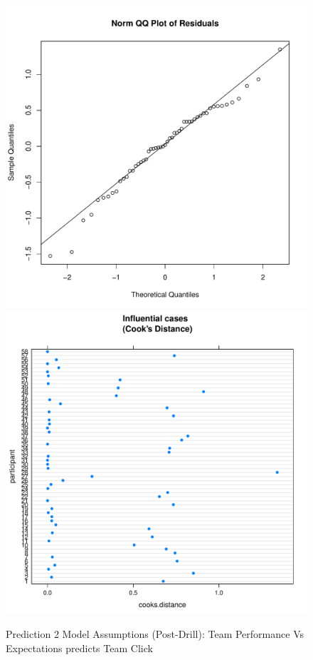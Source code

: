 \begin{CJK}{UTF8}{gbsn}
\begin{figure}[!htbp]
    \includegraphics[scale =.4]{images/TEM1QQNorm.pdf}
    \includegraphics[scale =.4]{images/TEM1CooksD.pdf}
    \caption{Prediction 2 Model Assumptions (Post-Drill): Team Performance Vs Expectations predicts Team Click}
    \label{fig:M1Assumptions}
\end{figure}


\end{CJK}
